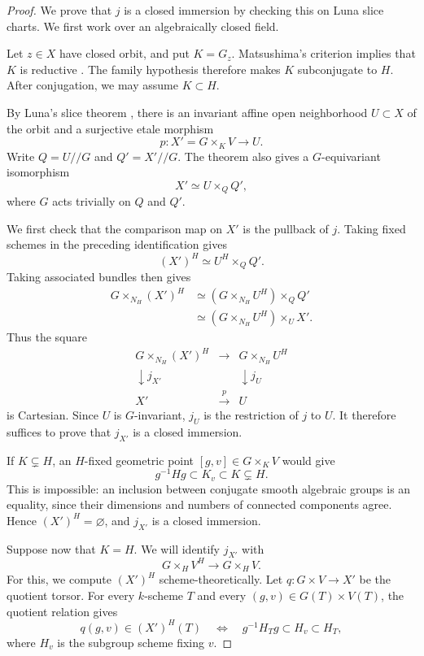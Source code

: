 \documentclass[11pt,reqno]{amsart}
\theoremstyle{definition}
\theoremstyle{remark}
\theoremstyle{plain}
\numberwithin{equation}{section}
\begin{document}
\begin{proof}
We prove that \(j\) is a closed immersion 
by checking this on Luna slice charts.
We first work over an algebraically closed field.

Let \(z\in X\) have closed orbit, and put \(K=G_z\).
Matsushima's criterion implies that \(K\) is reductive
\cite[I.2, Proposition]{Luna}.
The family hypothesis therefore makes \(K\) subconjugate to \(H\).
After conjugation, we may assume \(K\subset H\).

By Luna's slice theorem
\cite[III.1, Theorem, p.~97]{Luna},
there is an invariant affine open neighborhood \(U\subset X\)
of the orbit and a surjective etale morphism
\[
 p:X'=G\times_KV\longrightarrow U.
\]
Write \(Q=U/\!/G\) and \(Q'=X'/\!/G\).
The theorem also gives a \(G\)-equivariant isomorphism
\[
 X'\simeq U\times_QQ',
\]
where \(G\) acts trivially on \(Q\) and \(Q'\).

We first check that the comparison map on \(X'\) is the
pullback of \(j\).
Taking fixed schemes in the preceding identification gives
\[
 (X')^H\simeq U^H\times_QQ'.
\]
Taking associated bundles then gives
\[
 \begin{aligned}
 G\times_{N_H}(X')^H
 &\simeq (G\times_{N_H}U^H)\times_QQ'\\
 &\simeq (G\times_{N_H}U^H)\times_UX'.
 \end{aligned}
\]
Thus the square
\[
 \begin{array}{ccc}
 G\times_{N_H}(X')^H
   &\longrightarrow&G\times_{N_H}U^H\\
 \downarrow j_{X'}&&\downarrow j_U\\
 X'&\xrightarrow{\ p\ }&U
 \end{array}
\]
is Cartesian.
Since \(U\) is \(G\)-invariant, \(j_U\) is the restriction of
\(j\) to \(U\).
It therefore suffices to prove that \(j_{X'}\) is a closed
immersion.

If \(K\subsetneq H\), an \(H\)-fixed geometric point
\([g,v]\in G\times_KV\) would give
\[
 g^{-1}Hg\subset K_v\subset K\subsetneq H.
\]
This is impossible: an inclusion between conjugate smooth
algebraic groups is an equality, since their dimensions and
numbers of connected components agree.
Hence \((X')^H=\varnothing\), and \(j_{X'}\) is a closed
immersion.

Suppose now that \(K=H\).
We will identify \(j_{X'}\) with
\[
 G\times_HV^H\longrightarrow G\times_HV.
\]
For this, we compute \((X')^H\) scheme-theoretically.
Let \(q:G\times V\to X'\) be the quotient torsor.
For every \(k\)-scheme \(T\) and every
\((g,v)\in G(T)\times V(T)\), the quotient relation gives
\[
 q(g,v)\in (X')^H(T)
 \quad\Longleftrightarrow\quad
 g^{-1}H_Tg\subset H_v\subset H_T,
\]
where \(H_v\) is the subgroup scheme fixing \(v\).


\end{proof}
\end{document}
